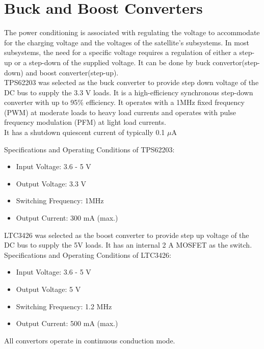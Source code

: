 \section[Switching Regulators]{Buck and Boost Converters}
The power conditioning is associated with regulating the voltage to accommodate
for the charging voltage and the voltages of the satellite's subsystems. In most
subsystems, the need for a specific voltage requires a regulation of either a step-up
or a step-down of the supplied voltage. It can be done by buck
convertor(step-down) and boost converter(step-up).\\
TPS62203 was selected as the buck converter to provide step down voltage of the DC bus to supply the 3.3 V loads. It is a high-efficiency synchronous step-down converter with up to 95\% efficiency. It operates with a 1MHz fixed frequency (PWM) at moderate loads to heavy load currents and operates with pulse
frequency modulation (PFM) at light load currents.\\

It has a shutdown quiescent current of typically 0.1 {$\mu$}A

 Specifications and Operating Conditions of TPS62203:
\begin{itemize}
	\item Input Voltage: 3.6 - 5 V
	\item Output Voltage:  3.3 V
	\item Switching Frequency: 1MHz
	\item Output Current: 300 mA (max.)
\end{itemize}


 LTC3426 was selected as the boost converter to provide step up voltage of the DC bus to supply the 5V loads. It has an internal 2 A MOSFET as the switch.\\
 
  Specifications and Operating Conditions of LTC3426:
 \begin{itemize}
 	\item Input Voltage: 3.6 - 5 V
 	\item Output Voltage: 5 V
 	\item Switching Frequency: 1.2 MHz
 	\item Output Current: 500 mA (max.)
 \end{itemize}
All convertors operate in continuous conduction mode.\\

